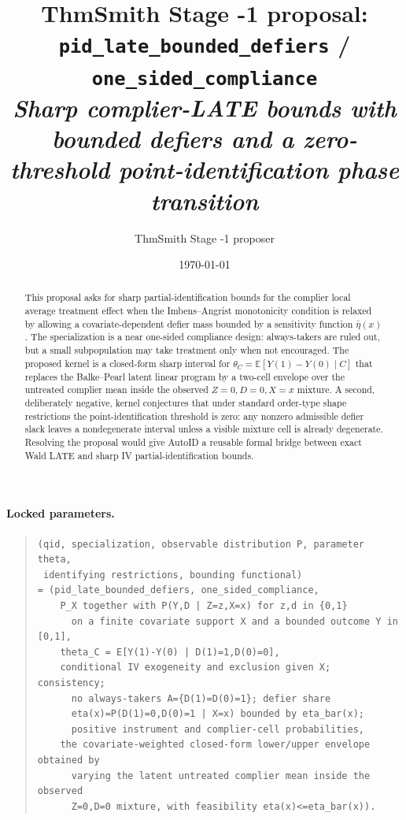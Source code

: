 \documentclass[11pt]{article}
\title{ThmSmith Stage -1 proposal: \texttt{pid\_late\_bounded\_defiers} / \texttt{one\_sided\_compliance}%
  \\ \large\textit{Sharp complier-LATE bounds with bounded defiers and a zero-threshold point-identification phase transition}}
\author{ThmSmith Stage -1 proposer}
\date{\today}
\newcommand{\E}{\mathbb{E}}
\theoremstyle{definition}
\theoremstyle{plain}
\theoremstyle{remark}
\begin{document}
\maketitle


\paragraph{Locked parameters.}
\begin{quote}\small
\begin{verbatim}
(qid, specialization, observable distribution P, parameter theta,
 identifying restrictions, bounding functional)
= (pid_late_bounded_defiers, one_sided_compliance,
    P_X together with P(Y,D | Z=z,X=x) for z,d in {0,1}
      on a finite covariate support X and a bounded outcome Y in [0,1],
    theta_C = E[Y(1)-Y(0) | D(1)=1,D(0)=0],
    conditional IV exogeneity and exclusion given X; consistency;
      no always-takers A={D(1)=D(0)=1}; defier share
      eta(x)=P(D(1)=0,D(0)=1 | X=x) bounded by eta_bar(x);
      positive instrument and complier-cell probabilities,
    the covariate-weighted closed-form lower/upper envelope obtained by
      varying the latent untreated complier mean inside the observed
      Z=0,D=0 mixture, with feasibility eta(x)<=eta_bar(x)).
\end{verbatim}
\end{quote}

\begin{abstract}
This proposal asks for sharp partial-identification bounds for the complier local average treatment effect when the Imbens--Angrist monotonicity condition is relaxed by allowing a covariate-dependent defier mass bounded by a sensitivity function \(\bar\eta(x)\).  The specialization is a near one-sided compliance design: always-takers are ruled out, but a small subpopulation may take treatment only when not encouraged.  The proposed kernel is a closed-form sharp interval for \(\theta_C=\E[Y(1)-Y(0)\mid C]\) that replaces the Balke--Pearl latent linear program by a two-cell envelope over the untreated complier mean inside the observed \(Z=0,D=0,X=x\) mixture.  A second, deliberately negative, kernel conjectures that under standard order-type shape restrictions the point-identification threshold is zero: any nonzero admissible defier slack leaves a nondegenerate interval unless a visible mixture cell is already degenerate.  Resolving the proposal would give AutoID a reusable formal bridge between exact Wald LATE and sharp IV partial-identification bounds.
\end{abstract}
\end{document}
